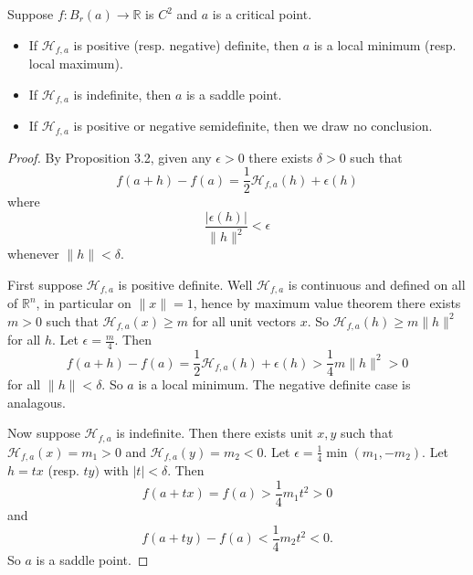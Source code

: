 \documentclass[12pt]{article}
\begin{document}
\begin{theorem}
	Suppose $f:B_r(a)\to\mathbb{R}$ is $C^2$ and $a$ is a critical point. 
	\begin{itemize}
		\item If $\mathcal{H}_{f,a}$ is positive (resp. negative) definite, then $a$ is a local minimum (resp. local maximum).
		\item If $\mathcal{H}_{f,a}$ is indefinite, then $a$ is a saddle point.
		\item If $\mathcal{H}_{f,a}$ is positive or negative semidefinite, then we draw no conclusion.
	\end{itemize}
\end{theorem}
\begin{proof} 
	By Proposition 3.2, given any $\epsilon>0$ there exists $\delta>0$ such that 
	\begin{equation*}
		f(a+h)-f(a) = \frac{1}{2}\mathcal{H}_{f,a}(h) + \epsilon(h)
	\end{equation*}
	where 
	\begin{equation*}
		\frac{|\epsilon(h)|}{\|h\|^2}<\epsilon
	\end{equation*}
	whenever $\|h\|<\delta$.

	First suppose $\mathcal{H}_{f,a}$ is positive definite. Well $\mathcal{H}_{f,a}$ is continuous and defined on all of $\mathbb{R}^n$, in particular on $\|x\|=1$, hence by maximum value theorem there exists $m>0$ such that $\mathcal{H}_{f,a}(x)\geq m$ for all unit vectors $x$. So $\mathcal{H}_{f,a}(h)\geq m\|h\|^2$ for all $h$. Let $\epsilon=\frac{m}{4}$. Then 
	\begin{equation*}
		f(a+h)-f(a) = \frac{1}{2}\mathcal{H}_{f,a}(h)+\epsilon(h) > \frac{1}{4}m\|h\|^2 > 0
	\end{equation*}
	for all $\|h\|<\delta$. So $a$ is a local minimum. The negative definite case is analagous.

	Now suppose $\mathcal{H}_{f,a}$ is indefinite. Then there exists unit $x,y$ such that $\mathcal{H}_{f,a}(x)=m_1>0$ and $\mathcal{H}_{f,a}(y)=m_2<0$. Let $\epsilon=\frac{1}{4}\min(m_1,-m_2)$. Let $h=tx$ (resp. $ty)$ with $|t|<\delta$. Then 
	\begin{equation*}
		f(a+tx)=f(a)>\frac{1}{4}m_1 t^2>0
	\end{equation*}
	and 
	\begin{equation*}
		f(a+ty)-f(a)<\frac{1}{4}m_2 t^2<0.
	\end{equation*}
	So $a$ is a saddle point.
\end{proof}	
\end{document}
